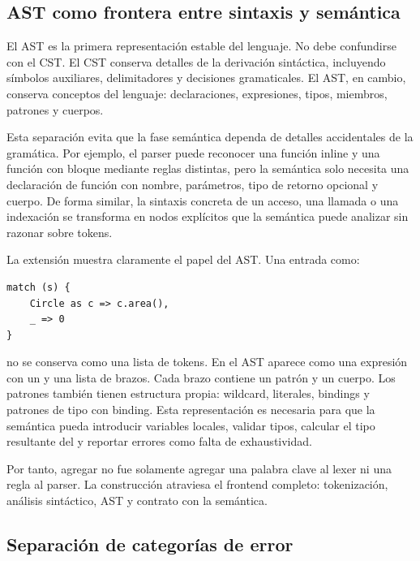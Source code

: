 \documentclass[12pt,letterpaper]{article}
\newcommand{\repo}[1]{\texttt{\detokenize{#1}}}
\begin{document}
\subsection{AST como frontera entre sintaxis y semántica}

El AST es la primera representación estable del lenguaje. No debe confundirse con el CST. El CST conserva detalles de la derivación sintáctica, incluyendo símbolos auxiliares, delimitadores y decisiones gramaticales. El AST, en cambio, conserva conceptos del lenguaje: declaraciones, expresiones, tipos, miembros, patrones y cuerpos.

Esta separación evita que la fase semántica dependa de detalles accidentales de la gramática. Por ejemplo, el parser puede reconocer una función inline y una función con bloque mediante reglas distintas, pero la semántica solo necesita una declaración de función con nombre, parámetros, tipo de retorno opcional y cuerpo. De forma similar, la sintaxis concreta de un acceso, una llamada o una indexación se transforma en nodos explícitos que la semántica puede analizar sin razonar sobre tokens.

La extensión \repo{match} muestra claramente el papel del AST. Una entrada como:

\begin{lstlisting}[language=HULK,caption={Expresión match en sintaxis fuente}]
match (s) {
    Circle as c => c.area(),
    _ => 0
}
\end{lstlisting}

no se conserva como una lista de tokens. En el AST aparece como una expresión \repo{Match} con un \repo{scrutinee} y una lista de brazos. Cada brazo contiene un patrón y un cuerpo. Los patrones también tienen estructura propia: wildcard, literales, bindings y patrones de tipo con binding. Esta representación es necesaria para que la semántica pueda introducir variables locales, validar tipos, calcular el tipo resultante del \repo{match} y reportar errores como falta de exhaustividad.

Por tanto, agregar \repo{match} no fue solamente agregar una palabra clave al lexer ni una regla al parser. La construcción atraviesa el frontend completo: tokenización, análisis sintáctico, AST y contrato con la semántica.

\subsection{Separación de categorías de error}
\end{document}

